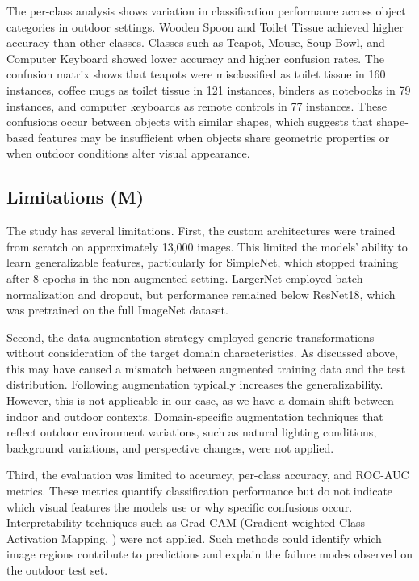 \documentclass[a4paper]{article}
\begin{document}
The per-class analysis shows variation in classification performance across object categories in outdoor settings. Wooden Spoon and Toilet Tissue achieved higher accuracy than other classes. Classes such as Teapot, Mouse, Soup Bowl, and Computer Keyboard showed lower accuracy and higher confusion rates. The confusion matrix shows that teapots were misclassified as toilet tissue in 160 instances, coffee mugs as toilet tissue in 121 instances, binders as notebooks in 79 instances, and computer keyboards as remote controls in 77 instances. These confusions occur between objects with similar shapes, which suggests that shape-based features may be insufficient when objects share geometric properties or when outdoor conditions alter visual appearance.

\subsection{Limitations (M)}
The study has several limitations. First, the custom architectures were trained from scratch on approximately 13,000 images. This limited the models' ability to learn generalizable features, particularly for SimpleNet, which stopped training after 8 epochs in the non-augmented setting. LargerNet employed batch normalization and dropout, but performance remained below ResNet18, which was pretrained on the full ImageNet dataset.

Second, the data augmentation strategy employed generic transformations without consideration of the target domain characteristics. As discussed above, this may have caused a mismatch between augmented training data and the test distribution. Following \citep{perez2017} augmentation typically increases the generalizability. However, this is not applicable in our case, as we have a domain shift between indoor and outdoor contexts. Domain-specific augmentation techniques that reflect outdoor environment variations, such as natural lighting conditions, background variations, and perspective changes, were not applied.

Third, the evaluation was limited to accuracy, per-class accuracy, and ROC-AUC metrics. These metrics quantify classification performance but do not indicate which visual features the models use or why specific confusions occur. Interpretability techniques such as Grad-CAM (Gradient-weighted Class Activation Mapping, \cite{selvaraju2016}) were not applied. Such methods could identify which image regions contribute to predictions \citep{selvaraju2016} and explain the failure modes observed on the outdoor test set.
\end{document}
